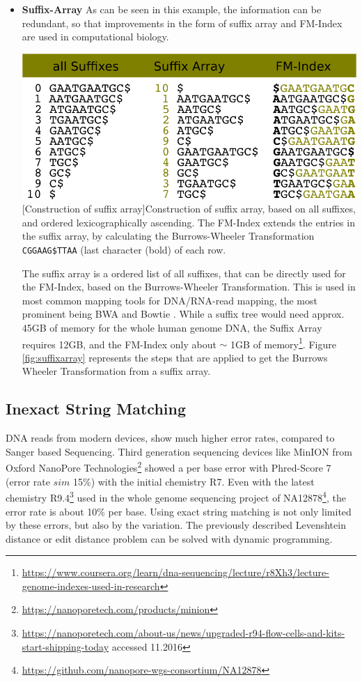 \begin{itemize}
\item \textbf{Suffix-Array}
As can be seen in this example, the information can be redundant, so that improvements in the form of suffix array and FM-Index are used in computational biology.  

 \begin{minipage}{\linewidth}
    \includegraphics[width=1\textwidth]{images/suffix.png}
    [Construction of suffix array]{Construction of suffix array, based on all suffixes, and ordered lexicographically ascending. The FM-Index extends the entries in the suffix array, by calculating the Burrows-Wheeler Transformation \texttt{CGGAAG\$TTAA} (last character (bold) of each row}.
    \label{fig:suffixarray}
\end{minipage}

The suffix array is a ordered list of all suffixes, that can be directly used for the FM-Index, based on the Burrows-Wheeler Transformation. This is used in most common mapping tools for DNA/RNA-read mapping, the most prominent being BWA \cite{Li2013a,Li2009} and Bowtie \cite{Langmead2009, Langmead2012}. While a suffix tree would need approx. 45GB of memory for the whole human genome DNA, the Suffix Array requires 12GB, and the FM-Index only about $\sim$ 1GB of memory\footnote{\url{https://www.coursera.org/learn/dna-sequencing/lecture/r8Xh3/lecture-genome-indexes-used-in-research}}. Figure \ref{fig:suffixarray} represents the steps that are applied to get the Burrows Wheeler Transformation from a suffix array.
 

\end{itemize}
\subsection{Inexact String Matching}
DNA reads from modern devices, show much higher error rates, compared to Sanger based Sequencing. Third generation sequencing devices like MinION from Oxford NanoPore Technologies\footnote{\url{https://nanoporetech.com/products/minion}} showed a per base error with Phred-Score 7 (error rate $sim$ 15\%) with the initial chemistry R7. Even with the latest chemistry R9.4\footnote{\url{https://nanoporetech.com/about-us/news/upgraded-r94-flow-cells-and-kits-start-shipping-today} accessed 11.2016} used in the whole genome sequencing project of NA12878\footnote{\url{https://github.com/nanopore-wgs-consortium/NA12878}}, the error rate is about 10\% per base. Using exact string matching is not only limited by these errors, but also by the variation. The previously described Levenshtein distance or edit distance problem can be solved with  dynamic programming.      
\label{inexact}
